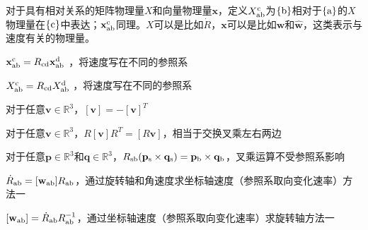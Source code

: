 \documentclass[12pt, a4paper, article, UTF8]{ctexart}
\begin{document}
\begin{mydefinition}
对于具有相对关系的矩阵物理量$X$和向量物理量$\mathbf{x}$，定义$X_\textnormal{ab}^\textnormal{c}$为$\{\textnormal{b}\}$相对于$\{\textnormal{a}\}$的$X$物理量在$\{\textnormal{c}\}$中表达；$\mathbf{x}_\textnormal{ab}^\textnormal{c}$同理。$X$可以是比如$\dot{R}$，$\mathbf{x}$可以是比如$\mathbf{w}$和$\hat{\mathbf{w}}$，这类表示与速度有关的物理量。
\end{mydefinition}

\begin{mytheorem}
$\mathbf{x}_\textnormal{ab}^{\textnormal{c}} = R_\textnormal{cd} \mathbf{x}_\textnormal{ab}^{\textnormal{d}} $ ，将速度写在不同的参照系 \label{th:relativespeedchangeframe}
\end{mytheorem}


\begin{mytheorem}
$X_\textnormal{ab}^{\textnormal{c}} = R_\textnormal{cd} X_\textnormal{ab}^{\textnormal{d}} $ ，将速度写在不同的参照系 \label{th:relativespeedmatrixchangeframe}
\end{mytheorem}

\begin{mytheorem}
对于任意$\mathbf{v}\in\mathbb{R}^3$，$[\mathbf{v}] = -[\mathbf{v}]^T $ \label{th:skewsymmetric}
\end{mytheorem}

\begin{mytheorem}
对于任意$\mathbf{v}\in\mathbb{R}^3$，$R[\mathbf{v}]R^T = [R\mathbf{v}]$，相当于交换叉乘左右两边 \label{th:skewrvr}
\end{mytheorem}

\begin{mytheorem}
对于任意$\mathbf{p}\in\mathbb{R}^3$和$\mathbf{q}\in\mathbb{R}^3$，$R_\textnormal{sb}(\mathbf{p}_\textnormal{s} \times \mathbf{q}_\textnormal{s}) = \mathbf{p}_\textnormal{b} \times \mathbf{q}_\textnormal{b}$，叉乘运算不受参照系影响 \label{th:crossproductchangeframe}
\end{mytheorem}

\begin{mytheorem}
$\dot{R}_\textnormal{ab} = [\mathbf{w}_\textnormal{ab}]R_\textnormal{ab}$，通过旋转轴和角速度求坐标轴速度（参照系取向变化速率）方法一\label{th:rabvelocity}
\end{mytheorem}

\begin{mytheorem}
$[\mathbf{w}_\textnormal{ab}] = \dot{R}_\textnormal{ab}R_\textnormal{ab}^{-1}$，通过坐标轴速度（参照系取向变化速率）求旋转轴方法一\label{th:computewab}
\end{mytheorem}
\end{document}
